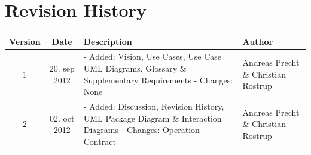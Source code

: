 \documentclass[a4paper, 10pt]{article}
\begin{document}
\section{Revision History}
\begin{tabular}{ | c | c | p{6cm} | p{3cm} | }
\hline
\textbf{Version} & \textbf{Date} & \textbf{Description} & \textbf{Author}
\\ \hline
1 & 20. sep 2012 & - Added: Vision, Use Cases, Use Case UML Diagrams, Glossary \& Supplementary Requirements - Changes: None & Andreas Precht \& Christian Rostrup
\\ \hline
2 & 02. oct 2012 & - Added: Discussion, Revision History, UML Package Diagram \& Interaction Diagrams - Changes: Operation Contract& Andreas Precht \& Christian Rostrup
\\ \hline
\end{tabular}
\end{document}
